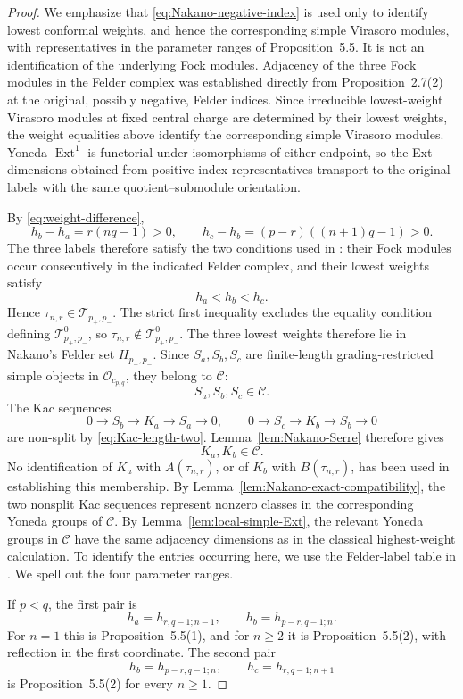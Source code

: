 \documentclass[12pt,leqno]{amsart}
\numberwithin{equation}{section}
\newcommand{\Ext}{\operatorname{Ext}}
\newcommand{\Oc}{\mathcal O}
\begin{document}
\begin{proof}
We emphasize that \eqref{eq:Nakano-negative-index} is used only to
identify lowest conformal weights, and hence the corresponding simple
Virasoro modules, with representatives in the parameter ranges of
Proposition~5.5.  It is not an identification of the underlying Fock
modules.  Adjacency of the three Fock modules in the Felder complex was
established directly from Proposition~2.7(2) at the original, possibly
negative, Felder indices.  Since irreducible lowest-weight Virasoro modules
at fixed central charge are determined by their lowest weights, the
weight equalities above identify the corresponding simple Virasoro
modules.  Yoneda $\Ext^1$ is functorial under isomorphisms of either
endpoint, so the Ext dimensions obtained from positive-index
representatives transport to the original labels with the same
quotient--submodule orientation.

By \eqref{eq:weight-difference},
\[
 h_b-h_a=r(nq-1)>0,
 \qquad
 h_c-h_b=(p-r)((n+1)q-1)>0.
\]
The three labels therefore satisfy the two conditions used in
\cite[Definition~5.6]{Nakano}: their Fock modules occur consecutively in
the indicated Felder complex, and their lowest weights satisfy
\[
 h_a<h_b<h_c.
\]
Hence $\tau_{n,r}\in\mathcal T_{p_+,p_-}$.  The strict first inequality
excludes the equality condition defining $\mathcal T^0_{p_+,p_-}$, so
$\tau_{n,r}\notin\mathcal T^0_{p_+,p_-}$.  The three
lowest weights therefore lie in Nakano's Felder set $H_{p_+,p_-}$.
Since $S_a,S_b,S_c$ are finite-length grading-restricted simple objects in
$\Oc_{c_{p,q}}$, they belong to
$\mathscr C$:
\[
 S_a,S_b,S_c\in\mathscr C.
\]
The Kac sequences
\[
 0\longrightarrow S_b\longrightarrow K_a\longrightarrow S_a
 \longrightarrow0,
 \qquad
 0\longrightarrow S_c\longrightarrow K_b\longrightarrow S_b
 \longrightarrow0
\]
are non-split by \eqref{eq:Kac-length-two}.  Lemma~\ref{lem:Nakano-Serre}
therefore gives
\[
 K_a,K_b\in\mathscr C.
\]
No identification of $K_a$ with $A(\tau_{n,r})$, or of
$K_b$ with $B(\tau_{n,r})$, has been used in establishing this
membership.  By Lemma~\ref{lem:Nakano-exact-compatibility}, the two
nonsplit Kac sequences represent nonzero classes in the corresponding
Yoneda groups of $\mathscr C$.  By
Lemma~\ref{lem:local-simple-Ext}, the relevant Yoneda groups in
$\mathscr C$ have the same adjacency dimensions as in the classical
highest-weight calculation.  To identify the entries occurring here,
we use the Felder-label table in \cite[Proposition~5.5]{Nakano}.
We spell out the four parameter ranges.

If $p<q$, the first pair is
\[
 h_a=h_{r,q-1;n-1},\qquad h_b=h_{p-r,q-1;n}.
\]
For $n=1$ this is Proposition~5.5(1), and for $n\ge2$ it is
Proposition~5.5(2), with reflection in the first coordinate.  The second
pair
\[
 h_b=h_{p-r,q-1;n},\qquad h_c=h_{r,q-1;n+1}
\]
is Proposition~5.5(2) for every $n\ge1$.


\end{proof}
\end{document}
